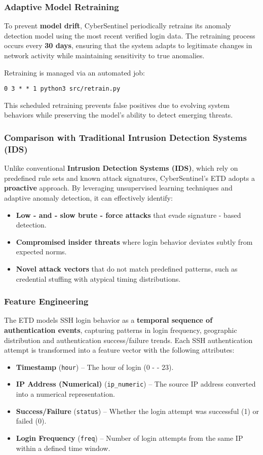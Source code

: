 \documentclass{article}
\begin{document}
\subsubsection{Adaptive Model Retraining}
To prevent \textbf{model drift}, CyberSentinel periodically retrains its anomaly detection model using the most recent verified login data. The retraining process occurs every \textbf{30 days}, ensuring that the system adapts to legitimate changes in network activity while maintaining sensitivity to true anomalies. 

Retraining is managed via an automated job:
\begin{verbatim}
0 3 * * 1 python3 src/retrain.py
\end{verbatim}

This scheduled retraining prevents false positives due to evolving system behaviors while preserving the model's ability to detect emerging threats.

\subsubsection{Comparison with Traditional Intrusion Detection Systems (IDS)}
Unlike conventional \textbf{Intrusion Detection Systems (IDS)}, which rely on predefined rule sets and known attack signatures, CyberSentinel's ETD adopts a \textbf{proactive} approach. By leveraging unsupervised learning techniques and adaptive anomaly detection, it can effectively identify:
\begin{itemize}
    \item \textbf{Low - and - slow brute - force attacks} that evade signature - based detection.
    \item \textbf{Compromised insider threats} where login behavior deviates subtly from expected norms.
    \item \textbf{Novel attack vectors} that do not match predefined patterns, such as credential stuffing with atypical timing distributions.
\end{itemize}

\subsubsection{Feature Engineering}
The ETD models SSH login behavior as a \textbf{temporal sequence of authentication events}, capturing patterns in login frequency, geographic distribution and authentication success/failure trends. Each SSH authentication attempt is transformed into a feature vector with the following attributes:
\begin{itemize}
    \item \textbf{Timestamp} (\texttt{hour}) – The hour of login (0 -  - 23).
    \item \textbf{IP Address (Numerical)} (\texttt{ip\_numeric}) – The source IP address converted into a numerical representation.
    \item \textbf{Success/Failure} (\texttt{status}) – Whether the login attempt was successful (1) or failed (0).
    \item \textbf{Login Frequency} (\texttt{freq}) – Number of login attempts from the same IP within a defined time window.
\end{itemize}
\end{document}
